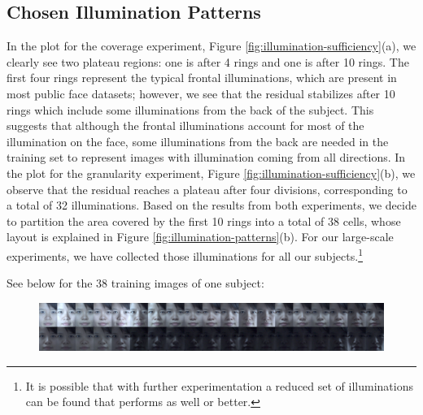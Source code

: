 \documentclass[12pt,journal,draftcls,letterpaper,onecolumn]{IEEEtran}
\begin{document}
\subsection{Chosen Illumination Patterns} In the plot for the
coverage experiment, Figure \ref{fig:illumination-sufficiency}(a),
 we clearly see two plateau regions: one is after 4 rings
and one is after 10 rings. The first four rings represent the
typical frontal illuminations, which are present in most public
face datasets; however, we see that the residual stabilizes
after 10 rings which include some illuminations from the back
of the subject. This suggests that although the frontal
illuminations account for most of the illumination on the face,
some illuminations from the back are needed in the training set to
represent images with illumination coming from all directions.
In the plot for the granularity experiment, Figure
\ref{fig:illumination-sufficiency}(b), we observe that the
residual reaches a plateau after four divisions, corresponding
to a total of 32 illuminations. Based on the results from both
experiments, we decide to partition the area covered by the
first 10 rings into a total of 38 cells, whose layout is
explained in Figure \ref{fig:illumination-patterns}(b). For
our large-scale experiments, we have collected those
illuminations for all our subjects.\footnote{It is possible
that with further experimentation a reduced set of illuminations
can be found that performs as well or better.}

See below for the 38 training images of one subject:
\begin{figure}[h]
\centering
\includegraphics[width=6.3in]{figures_cvpr/training.png}
\vspace{-.3in}
\end{figure}
\end{document}
